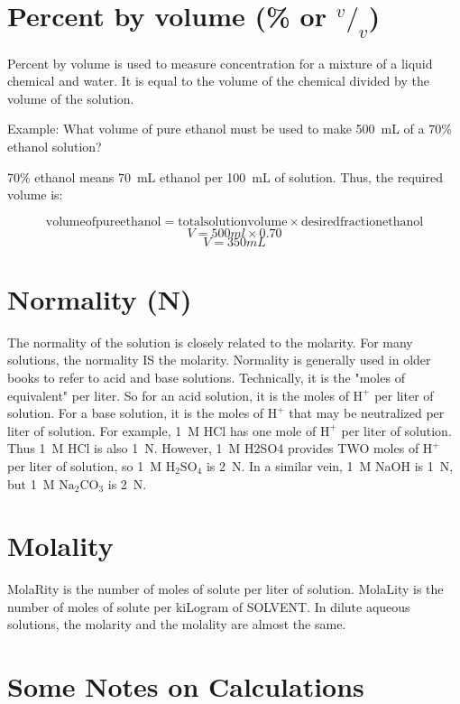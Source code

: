 \section{Percent by volume (\% or $^v/_v$)}

Percent by volume is used to measure concentration for a mixture of a liquid chemical and water. It is equal to the volume of the chemical divided by the volume of the solution.

Example: What volume of pure ethanol must be used to make 500~mL of a 70\% ethanol solution?

70\% ethanol means 70~mL ethanol per 100~mL of solution. Thus, the required volume is:

\[ \mathrm{volume of pure ethanol} = \mathrm{total solution volume} \times \mathrm{desired fraction ethanol} \]
\[ V = 500ml \times 0.70 \]
\[ V = 350 mL \] 

\section{Normality (N)}

The normality of the solution is closely related to the molarity. For many solutions, the normality IS the molarity. Normality is generally used in older books to refer to acid and base solutions. Technically, it is the "moles of equivalent" per liter. So for an acid solution, it is the moles of $\mathrm{H}^{+}$ per liter of solution. For a base solution, it is the moles of $\mathrm{H}^{+}$ that may be neutralized per liter of solution. For example, 1~M HCl has one mole of $\mathrm{H}^{+}$ per liter of solution. Thus 1~M HCl is also 1~N. However, 1~M H2SO4 provides TWO moles of $\mathrm{H}^{+}$ per liter of solution, so 1~M $\mathrm{H}_2\mathrm{SO}_4$ is 2~N. In a similar vein, 1~M NaOH is 1~N, but 1~M $\mathrm{Na}_2\mathrm{CO}_3$ is 2~N.

\section{Molality}

MolaRity is the number of moles of solute per liter of solution. MolaLity is the number of moles of solute per kiLogram of SOLVENT. In dilute aqueous solutions, the molarity and the molality are almost the same.

\section{Some Notes on Calculations}

